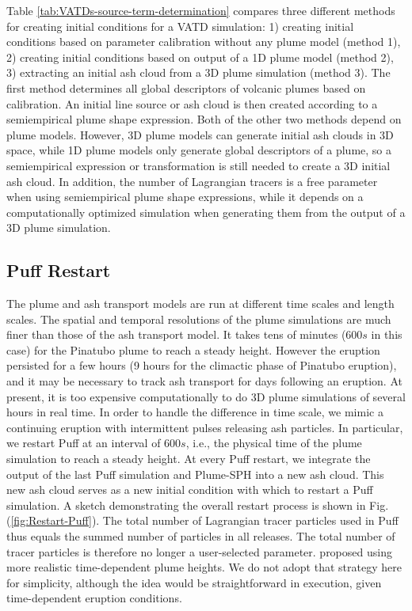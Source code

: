 \documentclass[utf8]{frontiersSCNS} %
\begin{document}
Table \ref{tab:VATDs-source-term-determination} compares three different methods for creating initial conditions for a VATD simulation: 1) creating initial conditions based on parameter calibration without any plume model (method 1), 2) creating initial conditions based on output of a 1D plume model (method 2), 3) extracting an initial ash cloud from a 3D plume simulation (method 3). The first method determines all global descriptors of volcanic plumes based on calibration. An initial line source or ash cloud is then created according to a semiempirical plume shape expression. Both of the other two methods depend on plume models. However, 3D plume models can generate initial ash clouds in 3D space, while 1D plume models only generate global descriptors of a plume, so a semiempirical expression or transformation is still needed to create a 3D initial ash cloud. In addition, the number of Lagrangian tracers is a free parameter when using semiempirical plume shape expressions, while it depends on a computationally optimized simulation when generating them from the output of a 3D plume simulation.

\subsection{Puff Restart}

The plume and ash transport models are run at different time scales and length scales. The spatial and temporal resolutions of the plume simulations are much finer than those of the ash transport model. It takes tens of minutes ($600 s$ in this case) for the Pinatubo plume to reach a steady height. However the eruption persisted for a few hours (9 hours for the climactic phase of Pinatubo eruption), and it may be necessary to track ash transport for days following an eruption. At present, it is too expensive computationally to do 3D plume simulations of several hours in real time. In order to handle the difference in time scale, we mimic a continuing eruption with intermittent pulses releasing ash particles. In particular, we restart Puff at an interval of $600 s$, i.e., the physical time of the plume simulation to reach a steady height. At every Puff restart, we integrate the output of the last Puff simulation and Plume-SPH into a new ash cloud. This new ash cloud serves as a new initial condition with which to restart a Puff simulation. A sketch demonstrating the overall restart process is shown in Fig. (\ref{fig:Restart-Puff}). The total number of Lagrangian tracer particles used in Puff thus equals the summed number of particles in all releases. The total number of tracer particles is therefore no longer a user-selected parameter.  \citet{fero2008simulation} proposed using more realistic time-dependent plume heights. We do not adopt that strategy here for simplicity, although the idea would be straightforward in execution, given time-dependent eruption conditions.
\end{document}
